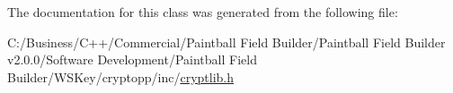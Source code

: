 The documentation for this class was generated from the following file:\begin{DoxyCompactItemize}
\item 
C:/Business/C++/Commercial/Paintball Field Builder/Paintball Field Builder v2.0.0/Software Development/Paintball Field Builder/WSKey/cryptopp/inc/\hyperlink{cryptlib_8h}{cryptlib.h}\end{DoxyCompactItemize}
